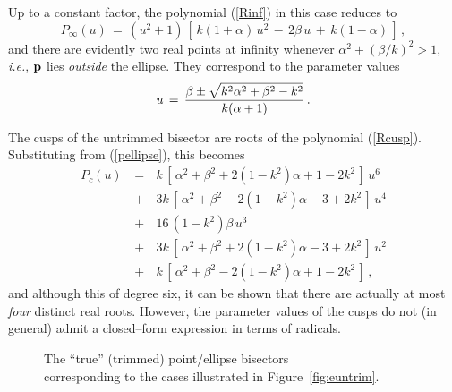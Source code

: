 Up to a constant factor, the polynomial (\ref{Rinf}) in this case
reduces to
\begin{equation}
P_\infty(u) \,=\, (u^2+1)\,
[\,k(1+\alpha)\,u^2\,-\,2\beta\,u\,+\,k(1-\alpha)\,] \,,
\end{equation}
and there are evidently two real points at infinity whenever $\alpha^2+
(\beta/k)^2>1$, {\it i.e.}, ${\bf p}$ lies {\it outside\/} the ellipse.
They correspond to the parameter values
\begin{equation} \label{uinfellps}
u \,=\, {\beta \pm \displaystyle{\sqrt
{k^2\alpha^2+\beta^2-k^2}} \over k(\alpha+1)} \,.
\end{equation}

The cusps of the untrimmed bisector are roots of the polynomial
(\ref{Rcusp}). Substituting from (\ref{pellipse}), this becomes
\begin{eqnarray}
P_c(u) &\,=\,& k\,[\,\alpha^2+\beta^2+2(1-k^2)\alpha+1-2k^2\,]\,u^6
 \nonumber \\
&\,+\,& 3k\,[\,\alpha^2+\beta^2-2(1-k^2)\alpha-3+2k^2\,]\,u^4
 \nonumber \\
&\,+\,& 16\,(1-k^2)\beta\,u^3
 \nonumber \\
&\,+\,& 3k\,[\,\alpha^2+\beta^2+2(1-k^2)\alpha-3+2k^2\,]\,u^2
 \nonumber \\
&\,+\,& k\,[\,\alpha^2+\beta^2-2(1-k^2)\alpha+1-2k^2\,] \,,
\end{eqnarray}
and although this of degree six, it can be shown that there
are actually at most {\it four\/} distinct real roots. However,
the parameter values of the cusps do not (in general) admit a
closed--form expression in terms of radicals.

\begin{figure}[htbp] \vspace{7.2in}
\caption[]{The ``true'' (trimmed) point/ellipse bisectors \\
corresponding to the cases illustrated in Figure~\ref{fig:euntrim}.}
\label{fig:etrim} \end{figure}

